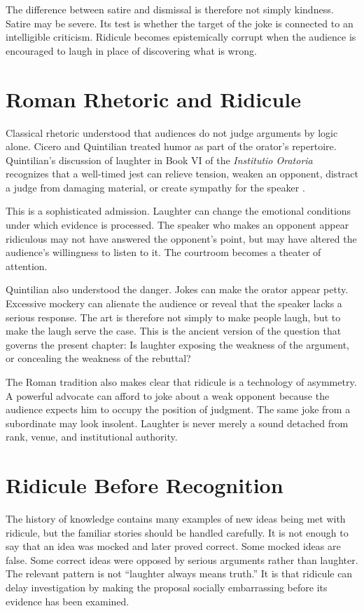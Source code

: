 ﻿\documentclass[12pt,a4paper]{book}
\begin{document}
The difference between satire and dismissal is therefore not simply kindness. Satire may be severe. Its test is whether the target of the joke is connected to an intelligible criticism. Ridicule becomes epistemically corrupt when the audience is encouraged to laugh in place of discovering what is wrong.

\section{Roman Rhetoric and Ridicule}

Classical rhetoric understood that audiences do not judge arguments by logic alone. Cicero and Quintilian treated humor as part of the orator's repertoire. Quintilian's discussion of laughter in Book VI of the \emph{Institutio Oratoria} recognizes that a well-timed jest can relieve tension, weaken an opponent, distract a judge from damaging material, or create sympathy for the speaker \cite{quintilian1920}.

This is a sophisticated admission. Laughter can change the emotional conditions under which evidence is processed. The speaker who makes an opponent appear ridiculous may not have answered the opponent's point, but may have altered the audience's willingness to listen to it. The courtroom becomes a theater of attention.

Quintilian also understood the danger. Jokes can make the orator appear petty. Excessive mockery can alienate the audience or reveal that the speaker lacks a serious response. The art is therefore not simply to make people laugh, but to make the laugh serve the case. This is the ancient version of the question that governs the present chapter: Is laughter exposing the weakness of the argument, or concealing the weakness of the rebuttal?

The Roman tradition also makes clear that ridicule is a technology of asymmetry. A powerful advocate can afford to joke about a weak opponent because the audience expects him to occupy the position of judgment. The same joke from a subordinate may look insolent. Laughter is never merely a sound detached from rank, venue, and institutional authority.

\section{Ridicule Before Recognition}

The history of knowledge contains many examples of new ideas being met with ridicule, but the familiar stories should be handled carefully. It is not enough to say that an idea was mocked and later proved correct. Some mocked ideas are false. Some correct ideas were opposed by serious arguments rather than laughter. The relevant pattern is not ``laughter always means truth.'' It is that ridicule can delay investigation by making the proposal socially embarrassing before its evidence has been examined.
\end{document}
